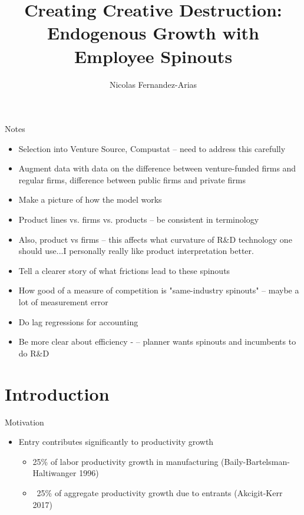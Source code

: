 \documentclass[english,usenames,dvipsnames]{beamer}
\title{Creating Creative Destruction: Endogenous Growth with Employee Spinouts}
\author{Nicolas Fernandez-Arias}
\begin{document}
\maketitle

\begin{frame}{Notes}
\begin{itemize}
	\item Selection into Venture Source, Compustat -- need to address this carefully
	\item Augment data with data on the difference between venture-funded firms and regular firms, difference between public firms and private firms
	\item Make a picture of how the model works
	\item Product lines vs. firms vs. products -- be consistent in terminology
	\item Also, product vs firms -- this affects what curvature of R\&D technology one should use...I personally really like product interpretation better.
	\item Tell a clearer story of what frictions lead to these spinouts
	\item How good of a measure of competition is "same-industry spinouts" -- maybe a lot of measurement error
	\item Do lag regressions for accounting
	\item Be more clear about efficiency - -- planner wants spinouts and incumbents to do R\&D
\end{itemize}
\end{frame}



\section{Introduction}

\begin{frame}{Motivation}
\begin{itemize}
	\item Entry contributes significantly to productivity growth
	\begin{itemize}
		\item 25\% of labor productivity growth in manufacturing (Baily-Bartelsman-Haltiwanger 1996)
		\item ~25\% of aggregate productivity growth due to entrants (Akcigit-Kerr 2017)
	\end{itemize}
\end{itemize}
\end{frame}
\end{document}
